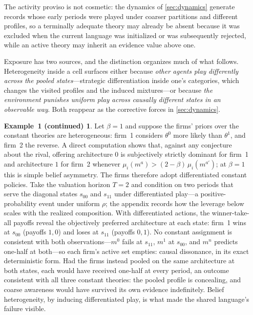 \documentclass[11pt]{article}
\theoremstyle{definition}
\newtheorem*{excont}{Example~1 (continued)}
\begin{document}
The activity proviso is not cosmetic: the dynamics of \cref{sec:dynamics} generate records whose early periods were played under coarser partitions and different profiles, so a terminally adequate theory may already be absent because it was excluded when the current language was initialized or was subsequently rejected, while an active theory may inherit an evidence value above one.

Exposure has two sources, and the distinction organizes much of what follows.
Heterogeneity inside a cell surfaces either because \emph{other agents play differently across the pooled states}---strategic differentiation inside one's categories, which changes the visited profiles and the induced mixtures---or because \emph{the environment punishes uniform play across causally different states in an observable way}.
Both reappear as the corrective forces in \cref{sec:dynamics}.

\begin{excont}
Let $\beta=1$ and suppose the firms' priors over the constant theories are heterogeneous: firm~1 considers $\theta^0$ more likely than $\theta^1$, and firm~2 the reverse.
A direct computation shows that, against any conjecture about the rival, offering architecture $0$ is subjectively strictly dominant for firm~1 and architecture $1$ for firm~2 whenever $\mu_i(m^a)>(2-\beta)\,\mu_i(m^{a'})$; at $\beta=1$ this is simple belief asymmetry.
The firms therefore adopt differentiated constant policies.
Take the valuation horizon $T=2$ and condition on two periods that serve the diagonal states $s_{00}$ and $s_{11}$ under differentiated play---a positive-probability event under uniform $\rho$; the appendix records how the leverage below scales with the realized composition.
With differentiated actions, the winner-take-all payoffs reveal the objectively preferred architecture at each state: firm~1 wins at $s_{00}$ (payoffs $1,0$) and loses at $s_{11}$ (payoffs $0,1$).
No constant assignment is consistent with both observations---$m^0$ fails at $s_{11}$, $m^1$ at $s_{00}$, and $m^n$ predicts one-half at both---so each firm's active set empties: causal dissonance, in its exact deterministic form.
Had the firms instead pooled on the same architecture at both states, each would have received one-half at every period, an outcome consistent with all three constant theories: the pooled profile is concealing, and coarse awareness would have survived its own evidence indefinitely.
Belief heterogeneity, by inducing differentiated play, is what made the shared language's failure visible.
\end{excont}
\end{document}
